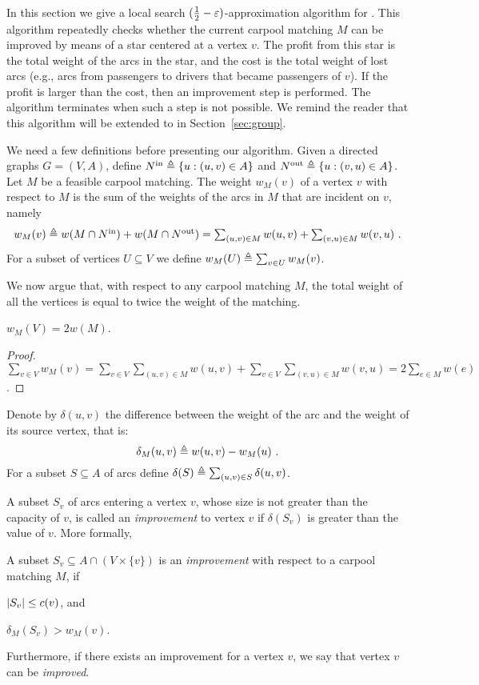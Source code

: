 
In this section we give a local search $(\half-\eps)$-approximation
algorithm for \carpool.  This algorithm repeatedly checks whether the
current carpool matching $M$ can be improved by means of a star
centered at a vertex $v$.  The profit from this star is the total
weight of the arcs in the star, and the cost is the total weight of
lost arcs (e.g., arcs from passengers to drivers that became
passengers of $v$).  If the profit is larger than the cost, then an
improvement step is performed.  The algorithm terminates when such a
step is not possible.
%
We remind the reader that this algorithm will be extended to \gcp in
Section~\ref{sec:group}.

We need a few definitions before presenting our algorithm.
%
Given a directed graphs $G = (V,A)$, define $\nin[] \eqdf \set{u :
(u,v) \in A}$ and $\nout[] \eqdf \set{u : (v,u) \in A}$.
%
Let $M$ be a feasible carpool matching.  The weight $w_M(v)$ of a
vertex $v$ with respect to $M$ is the sum of the weights of the arcs
in $M$ that are incident on $v$, namely
\[
\textstyle
w_M(v)
\eqdf w(M \cap \nin[]) + w(M \cap \nout[])
=     \sum_{(u, v) \in M} w(u, v) + \sum_{(v, u) \in M} w(v, u)
~.
\]
For a subset of vertices $U \subseteq V$ we define
$w_M(U) \eqdf \sum_{v \in U} w_M(v)$.

We now argue that, with respect to any carpool matching $M$, the total
weight of all the vertices is equal to twice the weight of the matching.

\begin{observation}
\label{lm:val-twice}
$w_M(V) = 2 w(M)$.
\end{observation}
\begin{proof}
\(
\displaystyle
\sum_{v \in V} w_M(v)
= \sum_{v \in V} \sum_{(u, v) \in M} w(u, v) +
    \sum_{v \in V} \sum_{(v, u) \in M} w(v, u) 
= 2 \sum_{e \in M} w(e)
\).
\end{proof}

Denote by $\delta(u,v)$ the difference between the weight of the arc
and the weight of its source vertex, that is:
\[
\delta_M(u, v) \eqdf w(u, v) - w_M(u)
~.
\]
For a subset $S \subseteq A$ of arcs define
$\delta(S) \eqdf \sum_{(u,v) \in S} \delta(u,v)$.

A subset $S_v$ of arcs entering a vertex $v$, whose size is not
greater than the capacity of $v$, is called an \emph{improvement} to
vertex $v$ if $\delta(S_v)$ is greater than the value of $v$.  More
formally, 

\begin{definition}
A subset $S_v \subseteq A \cap (V \times \{v\})$ is
an \emph{improvement} with respect to a carpool matching $M$, if%
\begin{inparaenum}[(i)]
\item $\abs{S_v} \leq c(v)$, and
\item $\delta_M(S_v) > w_M(v)$.
\end{inparaenum}
Furthermore, if there exists an improvement for a vertex $v$, we say
that vertex $v$ can be \emph{improved}.
\end{definition}

